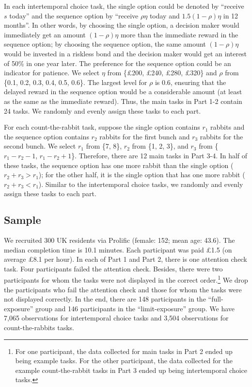 \documentclass[
  12pt,
]{article}
\begin{document}
In each intertemporal choice task, the single option could be denoted by
``receive \(s\) today'' and the sequence option by ``receive
\(\rho \eta\) today and \(1.5(1-\rho)\eta\) in 12 months''. In other
words, by choosing the single option, a decision maker would immediately
get an amount \((1-\rho)\eta\) more than the immediate reward in the
sequence option; by choosing the sequence option, the same amount
\((1-\rho)\eta\) would be invested in a riskless bond and the decision
maker would get an interest of 50\% in one year later. The preference
for the sequence option could be an indicator for patience. We select
\(\eta\) from \{£200, £240, £280, £320\} and \(\rho\) from \{0.1, 0.2,
0.3, 0.4, 0.5, 0.6\}. The largest level for \(\rho\) is 0.6, ensuring
that the delayed reward in the sequence option would be a considerable
amount (at least as the same as the immediate reward). Thus, the main
tasks in Part 1-2 contain 24 tasks. We randomly and evenly assign these
tasks to each part.

For each count-the-rabbit task, suppose the single option contains
\(r_1\) rabbits and the sequence option contains \(r_2\) rabbits for the
first bunch and \(r_3\) rabbits for the second bunch. We select \(r_1\)
from \{7, 8\}, \(r_2\) from \{1, 2, 3\}, and \(r_3\) from
\{\(r_1 - r_2 -1\), \(r_1 - r_2 +1\)\}. Therefore, there are 12 main
tasks in Part 3-4. In half of these tasks, the sequence option has one
more rabbit than the single option (\(r_2 + r_3 > r_1\)); for the other
half, it is the single option that has one more rabbit
(\(r_2 + r_3 < r_1\)). Similar to the intertemporal choice tasks, we
randomly and evenly assign these tasks to each part.

\hypertarget{sample}{%
\subsection{Sample}\label{sample}}

We recruited 300 UK residents via Prolific (female: 152; mean age:
43.6). The median completion time is 10.1 minutes. Each participant was
paid £1.5 (on average £8.1 per hour). In each of Part 1 and Part 2,
there is one attention check task. Four participants failed the
attention check. Besides, there were two participants for whom the tasks
were not displayed in the correct order.\footnote{For one participant,
  the data collected for main tasks in Part 2 ended up being example
  tasks. For the other participant, the data collected for the example
  count-the-rabbit tasks in Part 3 ended up being intertemporal choice
  tasks.} We drop the participants who fail the attention check and
those for whom the tasks were not displayed correctly. In the end, there
are 148 participants in the ``full-exposure'' group and 146 participants
in the ``limit-exposure'' group. We have 7,065 observations for
intertemporal choice tasks and 3,504 observations for count-the-rabbits
tasks.
\end{document}
